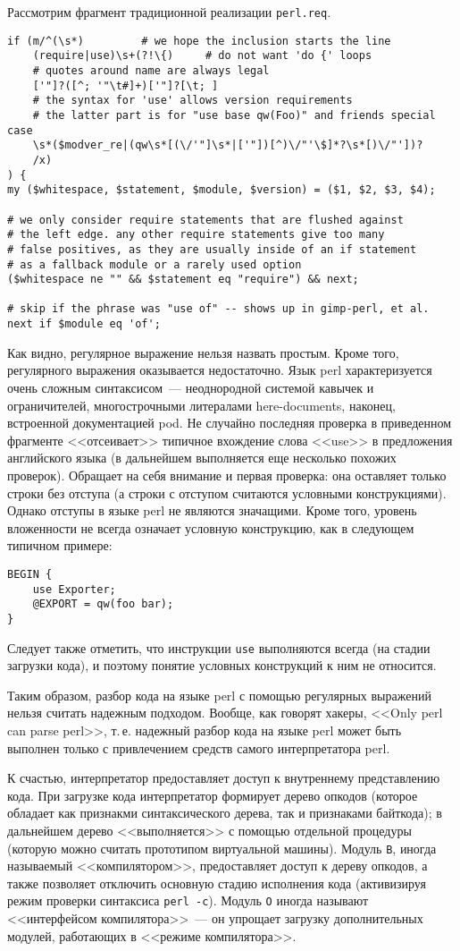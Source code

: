 \documentclass[russian,a4paper,12pt,titlepage]{article}
\begin{document}
Рассмотрим фрагмент традиционной реализации \verb|perl.req|.
\begin{verbatim}
if (m/^(\s*)         # we hope the inclusion starts the line
    (require|use)\s+(?!\{)     # do not want 'do {' loops
    # quotes around name are always legal
    ['"]?([^; '"\t#]+)['"]?[\t; ]
    # the syntax for 'use' allows version requirements
    # the latter part is for "use base qw(Foo)" and friends special case
    \s*($modver_re|(qw\s*[(\/'"]\s*|['"])[^)\/"'\$]*?\s*[)\/"'])?
    /x)
) {
my ($whitespace, $statement, $module, $version) = ($1, $2, $3, $4);

# we only consider require statements that are flushed against
# the left edge. any other require statements give too many
# false positives, as they are usually inside of an if statement
# as a fallback module or a rarely used option
($whitespace ne "" && $statement eq "require") && next;

# skip if the phrase was "use of" -- shows up in gimp-perl, et al.
next if $module eq 'of';
\end{verbatim}
Как видно, регулярное выражение нельзя назвать простым.  Кроме того, регулярного выражения оказывается недостаточно.
Язык perl характеризуется очень сложным синтаксисом~--- неоднородной системой кавычек и ограничителей, многострочными
литералами here-documents, наконец, встроенной документацией pod.  Не случайно последняя проверка в приведенном фрагменте
<<отсеивает>> типичное вхождение слова <<use>> в предложения английского языка (в дальнейшем выполняется еще несколько
похожих проверок).  Обращает на себя внимание и первая проверка: она оставляет только строки без отступа (а строки с отступом
считаются условными конструкциями).  Однако отступы в языке perl не являются значащими.  Кроме того, уровень вложенности
не всегда означает условную конструкцию, как в следующем типичном примере:
\begin{verbatim}
BEGIN {
    use Exporter;
    @EXPORT = qw(foo bar);
}
\end{verbatim}
Следует также отметить, что инструкции \verb|use| выполняются всегда (на стадии загрузки кода),
и поэтому понятие условных конструкций к ним не относится.

Таким образом, разбор кода на языке perl с помощью регулярных выражений нельзя считать надежным подходом.
Вообще, как говорят хакеры, <<Only perl can parse perl>>, т.\,е. надежный разбор кода на языке perl
может быть выполнен только с привлечением средств самого интерпретатора perl.

К счастью, интерпретатор предоставляет доступ к внутреннему представлению кода.  При загрузке кода
интерпретатор формирует дерево опкодов (которое обладает как признакми синтаксического дерева,
так и признаками байткода); в дальнейшем дерево <<выполняется>> с помощью отдельной процедуры (которую
можно считать прототипом виртуальной машины).  Модуль \verb|B|, иногда называемый <<компилятором>>,
предоставляет доступ к дереву опкодов, а также позволяет отключить основную стадию исполнения кода
(активизируя режим проверки синтаксиса \texttt{perl -c}).  Модуль \verb|O| иногда называют <<интерфейсом
компилятора>>~--- он упрощает загрузку дополнительных модулей, работающих в <<режиме компилятора>>.
\end{document}
